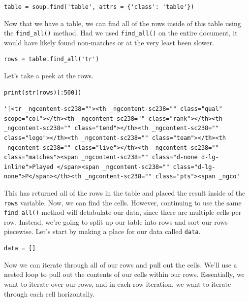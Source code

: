 \begin{lstlisting}[style=pippython]
table = soup.find('table', attrs = {'class': 'table'})
\end{lstlisting}
Now that we have a table, we can find all of the rows inside of this table using the \verb|find_all()| method. Had we used \verb|find_all()| on the entire document, it would have likely found non-matches or at the very least been slower.\par
\begin{lstlisting}[style=pippython]
rows = table.find_all('tr')
\end{lstlisting}
Let's take a peek at the rows.
\begin{lstlisting}[style=pippython]
print(str(rows)[:500])
\end{lstlisting}
\begin{lstlisting}[style=none]
'[<tr _ngcontent-sc238=""><th _ngcontent-sc238="" class="qual" scope="col"></th><th _ngcontent-sc238="" class="rank"></th><th _ngcontent-sc238="" class="tend"></th><th _ngcontent-sc238="" class="logo"></th><th _ngcontent-sc238="" class="team"></th><th _ngcontent-sc238="" class="live"></th><th _ngcontent-sc238="" class="matches"><span _ngcontent-sc238="" class="d-none d-lg-inline">Played </span><span _ngcontent-sc238="" class="d-lg-none">P</span></th><th _ngcontent-sc238="" class="pts"><span _ngco'
\end{lstlisting}
This has returned all of the rows in the table and placed the result inside of the \verb|rows| variable. Now, we can find the cells. However, continuing to use the same \verb|find_all()| method will detabulate our data, since there are multiple cells per row. Instead, we're going to split up our table into rows and sort our rows piecewise. Let's start by making a place for our data called \verb|data|.\par
\begin{lstlisting}[style=pippython]
data = []
\end{lstlisting}
Now we can iterate through all of our rows and pull out the cells. We'll use a nested loop to pull out the contents of our cells within our rows. Essentially, we want to iterate over our rows, and in each row iteration, we want to iterate through each cell horizontally.\par
{}
